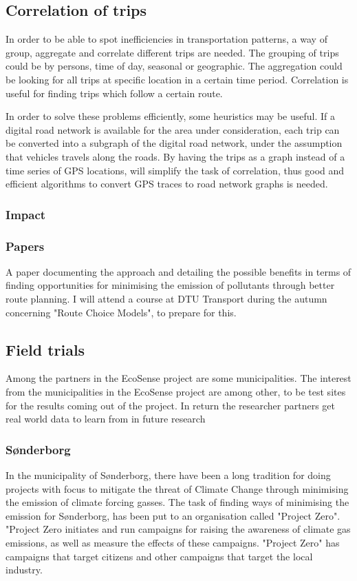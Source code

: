 \subsection{Correlation of trips}
In order to be able to spot inefficiencies in transportation patterns, a way of group, aggregate and correlate different trips are needed. The grouping of trips could be by persons, time of day, seasonal or geographic. The aggregation could be looking for all trips at specific location in a certain time period. Correlation is useful for finding trips which follow a certain route.

In order to solve these problems efficiently, some heuristics may be useful. If a digital road network is available for the area under consideration, each trip can be converted into a subgraph of the  digital road network, under the assumption that vehicles travels along the roads. By having the trips as a graph instead of a time series of GPS locations, will simplify the task of correlation, thus good and efficient algorithms to convert GPS traces to road network graphs is needed.
\subsubsection{Impact}

\subsubsection{Papers}
A paper documenting the approach and detailing the possible benefits in terms of finding opportunities for minimising the emission of pollutants through better route planning. I will attend a course at DTU Transport during the autumn concerning "Route Choice Models", to prepare for this.
\subsection{Field trials}
Among the partners in the EcoSense project are some municipalities. The interest from the municipalities in the EcoSense project are among other, to be test sites for the results coming out of the project. In return the researcher partners get real world data to learn from in future research
\subsubsection{S\o nderborg}
In the municipality of S\o nderborg, there have been a long tradition for doing projects with focus to mitigate the threat of Climate Change through minimising the emission of climate forcing gasses. The task of finding ways of minimising the emission for S\o nderborg, has been put to an organisation called "Project Zero". "Project Zero initiates and run campaigns for raising the awareness of climate gas emissions, as well as measure the effects of these campaigns. "Project Zero" has campaigns that target citizens and other campaigns that target the local industry.

